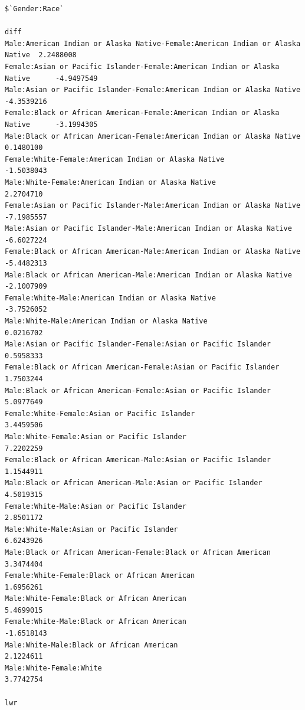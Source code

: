 \documentclass[
  letterpaper,
  DIV=11,
  numbers=noendperiod]{scrartcl}
\begin{document}
\begin{verbatim}
$`Gender:Race`
                                                                                    diff
Male:American Indian or Alaska Native-Female:American Indian or Alaska Native  2.2488008
Female:Asian or Pacific Islander-Female:American Indian or Alaska Native      -4.9497549
Male:Asian or Pacific Islander-Female:American Indian or Alaska Native        -4.3539216
Female:Black or African American-Female:American Indian or Alaska Native      -3.1994305
Male:Black or African American-Female:American Indian or Alaska Native         0.1480100
Female:White-Female:American Indian or Alaska Native                          -1.5038043
Male:White-Female:American Indian or Alaska Native                             2.2704710
Female:Asian or Pacific Islander-Male:American Indian or Alaska Native        -7.1985557
Male:Asian or Pacific Islander-Male:American Indian or Alaska Native          -6.6027224
Female:Black or African American-Male:American Indian or Alaska Native        -5.4482313
Male:Black or African American-Male:American Indian or Alaska Native          -2.1007909
Female:White-Male:American Indian or Alaska Native                            -3.7526052
Male:White-Male:American Indian or Alaska Native                               0.0216702
Male:Asian or Pacific Islander-Female:Asian or Pacific Islander                0.5958333
Female:Black or African American-Female:Asian or Pacific Islander              1.7503244
Male:Black or African American-Female:Asian or Pacific Islander                5.0977649
Female:White-Female:Asian or Pacific Islander                                  3.4459506
Male:White-Female:Asian or Pacific Islander                                    7.2202259
Female:Black or African American-Male:Asian or Pacific Islander                1.1544911
Male:Black or African American-Male:Asian or Pacific Islander                  4.5019315
Female:White-Male:Asian or Pacific Islander                                    2.8501172
Male:White-Male:Asian or Pacific Islander                                      6.6243926
Male:Black or African American-Female:Black or African American                3.3474404
Female:White-Female:Black or African American                                  1.6956261
Male:White-Female:Black or African American                                    5.4699015
Female:White-Male:Black or African American                                   -1.6518143
Male:White-Male:Black or African American                                      2.1224611
Male:White-Female:White                                                        3.7742754
                                                                                     lwr

\end{verbatim}
\end{document}
